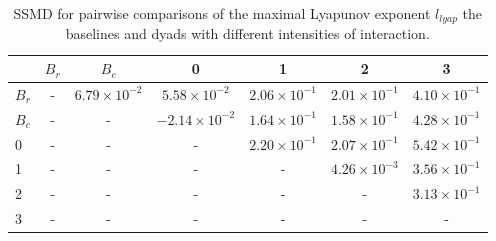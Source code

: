 \begin{table}
\centering
\caption{SSMD for pairwise comparisons of the maximal Lyapunov exponent $l_{lyap}$ the baselines and dyads with different intensities of interaction.}
\label{tab:ssmd_lyapunov}
\begin{tabular}{lcccccc}
\toprule
 & $B_r$ & $B_c$ & 0 & 1 & 2 & 3 \\
\midrule
$B_r$ & - & $6.79 \times 10^{-2}$ & $5.58 \times 10^{-2}$ & $2.06 \times 10^{-1}$ & $2.01 \times 10^{-1}$ & $4.10 \times 10^{-1}$ \\
$B_c$ & - & - & $-2.14 \times 10^{-2}$ & $1.64 \times 10^{-1}$ & $1.58 \times 10^{-1}$ & $4.28 \times 10^{-1}$ \\
0 & - & - & - & $2.20 \times 10^{-1}$ & $2.07 \times 10^{-1}$ & $5.42 \times 10^{-1}$ \\
1 & - & - & - & - & $4.26 \times 10^{-3}$ & $3.56 \times 10^{-1}$ \\
2 & - & - & - & - & - & $3.13 \times 10^{-1}$ \\
3 & - & - & - & - & - & - \\
\bottomrule
\end{tabular}
\end{table}
